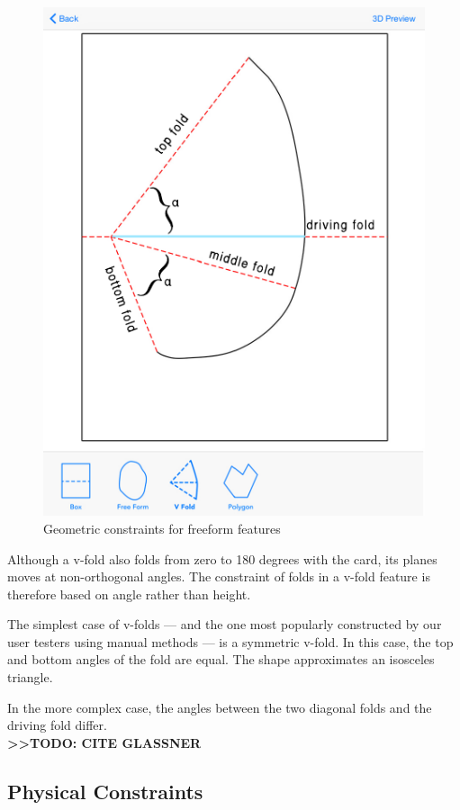 \begin{figure}[htbp]
\centering
\includegraphics{figures/45_Tech_Constraints/vfoldConstraints.pdf}
\caption{Geometric constraints for freeform features}
\end{figure}

Although a v-fold also folds from zero to 180 degrees with the card, its
planes moves at non-orthogonal angles. The constraint of folds in a
v-fold feature is therefore based on angle rather than height.

The simplest case of v-folds --- and the one most popularly constructed
by our user testers using manual methods --- is a symmetric v-fold. In
this case, the top and bottom angles of the fold are equal. The shape
approximates an isosceles triangle.

In the more complex case, the angles between the two diagonal folds and
the driving fold differ.\\\textbf{\textgreater{}\textgreater{}TODO: CITE
GLASSNER}

\subsection{Physical Constraints}\label{physical-constraints}

